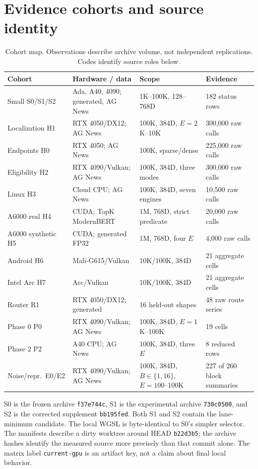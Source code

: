 \documentclass[10pt]{article}
\begin{document}
\section{Evidence cohorts and source identity}\label{sec:cohorts}
\begin{table}[H]\centering\small
\caption{Cohort map. Observations describe archive volume, not independent replications. Codes identify source roles below.}
\begin{tabular}{L{.24\linewidth}L{.23\linewidth}L{.22\linewidth}L{.19\linewidth}}
\toprule Cohort & Hardware / data & Scope & Evidence \\
\midrule
Small S0/S1/S2 & Ada, A40, 4090; generated, AG News & 1K--100K, 128--768D & 182 status rows \\
Localization H1 & RTX 4050/DX12; AG News & 100K, 384D, $E=2$K--10K & 300,000 raw calls \\
Endpoints H0 & RTX 4050; AG News & 100K, sparse/dense & 225,000 raw calls \\
Eligibility H2 & RTX 4090/Vulkan; AG News & 100K, 384D, three modes & 300,000 raw calls \\
Linux H3 & Cloud CPU; AG News & 100K, 384D, seven engines & 10,500 raw calls \\
A6000 real H4 & CUDA; TopK ModernBERT & 1M, 768D, strict predicate & 20,000 raw calls \\
A6000 synthetic H5 & CUDA; generated FP32 & 1M, 768D, four $E$ & 4,000 raw calls \\
Android H6 & Mali-G615/Vulkan & 10K/100K, 384D & 21 aggregate cells \\
Intel Arc H7 & Arc/Vulkan & 10K/100K, 384D & 21 aggregate cells \\
Router R1 & RTX 4050/DX12; generated & 16 held-out shapes & 48 raw route series \\
Phase 0 P0 & RTX 4090/Vulkan; AG News & 100K, 384D, $E=1$K--100K & 19 cells \\
Phase 2 P2 & A40 CPU; AG News & 100K, 384D, three $E$ & 8 reduced rows \\
Noise/repr.\ E0/E2 & RTX 4090/Vulkan; AG News & 100K, 384D, $B\in\{1,16\}$, $E=100$--100K & 227 of 260 block summaries \\
\bottomrule\end{tabular}\end{table}
S0 is the frozen archive \texttt{f37e744c}, S1 is the experimental archive \texttt{730c0500}, and S2 is the corrected supplement \texttt{bb195fed}. Both S1 and S2 contain the lane-minimum candidate. The local WGSL is byte-identical to S0's simpler selector. The manifests describe a dirty worktree around HEAD \texttt{b22d3b5}; the archive hashes identify the measured source more precisely than that commit alone. The matrix label \texttt{current-gpu} is an artifact key, not a claim about final local behavior.
\end{document}
